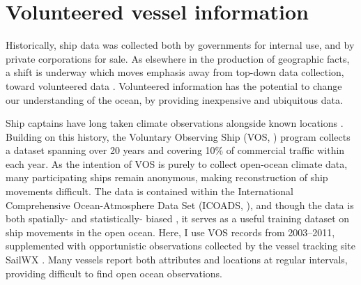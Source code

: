 \section{Volunteered vessel information}


Historically, ship data was collected both by governments for internal use, and by private corporations for sale. As elsewhere in the production of geographic facts, a shift is underway which moves emphasis away from top-down data collection, toward volunteered data \citep{goodchild2007citizens,elwood2011researching}. Volunteered information has the potential to change our understanding of the ocean, by providing inexpensive and ubiquitous data.

Ship captains have long taken climate observations alongside known locations \citep{brohan2009marine}.  Building on this history, the Voluntary Observing Ship (VOS, \citealp{VOSOverview}) program collects a dataset spanning over 20 years and covering 10\% of commercial traffic within each year. As the intention of VOS is purely to collect open-ocean climate data, many participating ships remain anonymous, making reconstruction of ship movements difficult.  The data is contained within the International Comprehensive Ocean-Atmosphere Data Set (ICOADS, \citealp{woodruff2010icoads}), and though the data is both spatially- and statistically- biased \citep{Wang2007}, it serves as a useful training dataset on ship movements in the open ocean. Here, I use VOS records from 2003--2011, supplemented with opportunistic observations collected by the vessel tracking site SailWX \citep{SAILWX}. Many vessels report both attributes and locations at regular intervals, providing difficult to find open ocean observations.

